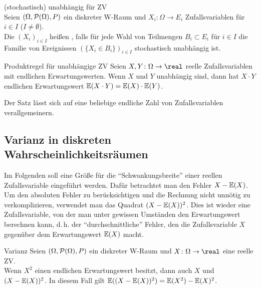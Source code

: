 \begin{Def}{(stochastisch) unabhängig für ZV}\\
    Seien $(\Omega, \P(\Omega), P)$ ein diskreter W-Raum und
    $X_i\colon \Omega \rightarrow E_i$ Zufallsvariablen für $i \in I$ ($I \not= \emptyset$).\\
    Die $(X_i)_{i \in I}$ heißen ,
    falls für jede Wahl von Teilmengen
    $B_i \subset E_i$ für $i \in I$ die Familie von Ereignissen
    $(\{X_i \in B_i\})_{i \in I}$ stochastisch unabhängig ist.
\end{Def}

\begin{Satz}{Produktregel für unabhängige ZV}
    Seien $X, Y\colon \Omega \rightarrow \real$ reelle Zufallsvariablen mit endlichen
    Erwartungswerten.
    Wenn $X$ und $Y$ unabhängig sind, dann hat $X \cdot Y$ endlichen Erwartungswert
    $\EW(X \cdot Y) = \EW(X) \cdot \EW(Y)$.
\end{Satz}

\begin{Bem}
    Der Satz lässt sich auf eine beliebige endliche Zahl von Zufallsvariablen verallgemeinern.
\end{Bem}

\pagebreak

\subsection{%
    Varianz in diskreten Wahrscheinlichkeitsräumen%
}

\begin{Bem}
    Im Folgenden soll eine Größe für die "`Schwankungsbreite"' einer reellen Zufallsvariable
    eingeführt werden.
    Dafür betrachtet man den Fehler $X - \EW(X)$.
    Um den absoluten Fehler zu berücksichtigen und die Rechnung nicht unnötig zu verkomplizieren,
    verwendet man das Quadrat $(X - \EW(X))^2$.
    Dies ist wieder eine Zufallsvariable, von der man unter gewissen Umständen den Erwartungswert
    berechnen kann, d.\,h. der "`durchschnittliche"' Fehler, den die Zufallsvariable $X$ gegenüber
    dem Erwartungswert $\EW(X)$ macht.
\end{Bem}

\linie

\begin{Lemma}{Varianz}
    Seien $(\Omega, \P(\Omega), P)$ ein diskreter W-Raum und
    $X\colon \Omega \rightarrow \real$ eine reelle ZV.\\
    Wenn $X^2$ einen endlichen Erwartungswert besitzt, dann auch $X$ und
    $(X - \EW(X))^2$.
    In diesem Fall gilt $\EW((X - \EW(X))^2) = \EW(X^2) - \EW(X)^2$.
\end{Lemma}

